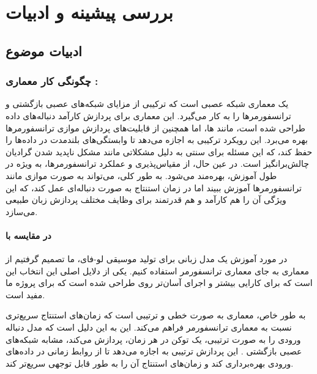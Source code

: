 
\chapter{بررسی پیشینه و ادبیات}
\section{ادبیات موضوع}
\subsection{چگونگی کار معماری :}

 \cite{RWKV} \cite{peng2024eagle} یک معماری شبکه عصبی است که ترکیبی از مزایای شبکه‌های عصبی بازگشتی  \cite{1808.03314} و ترانسفورمرها  \cite{1706.03762} را به کار می‌گیرد. این معماری برای پردازش کارآمد دنباله‌های داده طراحی شده است، مانند  ها، اما همچنین از قابلیت‌های پردازش موازی ترانسفورمرها بهره می‌برد. این رویکرد ترکیبی به  اجازه می‌دهد تا وابستگی‌های بلندمدت در داده‌ها را حفظ کند، که این مسئله برای  سنتی به دلیل مشکلاتی مانند مشکل ناپدید شدن گرادیان چالش‌برانگیز است. در عین حال، از مقیاس‌پذیری و عملکرد ترانسفورمرها، به ویژه در طول آموزش، بهره‌مند می‌شود. به طور کلی،  می‌تواند به صورت موازی مانند ترانسفورمرها آموزش ببیند اما در زمان استنتاج به صورت دنباله‌ای عمل کند، که این ویژگی آن را هم کارآمد و هم قدرتمند برای وظایف مختلف پردازش زبان طبیعی می‌سازد.

\subsubsection{ در مقایسه با }
در مورد آموزش یک مدل زبانی برای تولید موسیقی لو-فای، ما تصمیم گرفتیم از معماری  به جای معماری ترانسفورمر استفاده کنیم. یکی از دلایل اصلی این انتخاب این است که  برای کارایی بیشتر و اجرای آسان‌تر روی  طراحی شده است که برای پروژه ما مفید است.

به طور خاص، معماری  به صورت خطی و ترتیبی است که زمان‌های استنتاج سریع‌تری نسبت به معماری ترانسفورمر فراهم می‌کند. این به این دلیل است که مدل  دنباله ورودی را به صورت ترتیبی، یک توکن در هر زمان، پردازش می‌کند، مشابه شبکه‌های عصبی بازگشتی . این پردازش ترتیبی به  اجازه می‌دهد تا از روابط زمانی در داده‌های ورودی بهره‌برداری کند و زمان‌های استنتاج آن را به طور قابل توجهی سریع‌تر کند.

